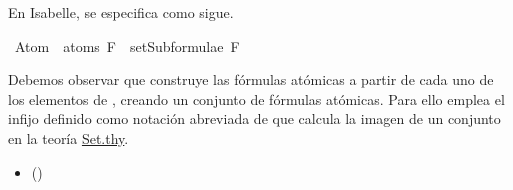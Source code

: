 \begin{isabellebody}
\begin{isamarkuptext}
  En Isabelle, se especifica como sigue.%
\end{isamarkuptext}\isamarkuptrue%
\isamarkupfalse%
\ {\isachardoublequoteopen}Atom\ {\isacharbackquote}\ atoms\ F\ {\isasymsubseteq}\ setSubformulae\ F{\isachardoublequoteclose}\isanewline
%
\isadelimproof
\ \ %
\endisadelimproof
%
\isatagproof
{}\isamarkupfalse%
%
\endisatagproof
{\isafoldproof}%
%
\isadelimproof
%
\endisadelimproof
%
\begin{isamarkuptext}%
Debemos observar que  construye las fórmulas 
  atómicas a partir de cada uno de los elementos de , creando 
  un conjunto de fórmulas atómicas. Para ello emplea el infijo \isa{{\isacharbackquote}} 
  definido como notación abreviada de \isa{{\isacharparenleft}{\isacharbackquote}{\isacharparenright}} que calcula la 
  imagen de un conjunto en la teoría \href{https://n9.cl/qatp}{Set.thy}.

  \begin{itemize}
    \item[]  
      \hfill ()
  \end{itemize}


\end{isamarkuptext}
\end{isabellebody}
